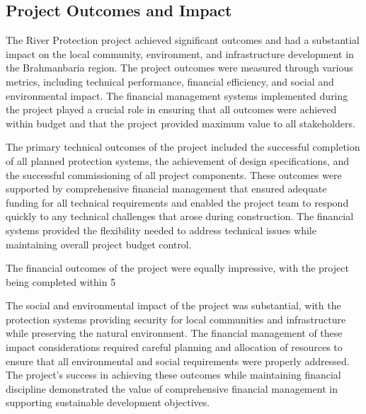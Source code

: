 \subsection{Project Outcomes and Impact}
The River Protection project achieved significant outcomes and had a substantial impact on the local community, environment, and infrastructure development in the Brahmanbaria region. The project outcomes were measured through various metrics, including technical performance, financial efficiency, and social and environmental impact. The financial management systems implemented during the project played a crucial role in ensuring that all outcomes were achieved within budget and that the project provided maximum value to all stakeholders.

The primary technical outcomes of the project included the successful completion of all planned protection systems, the achievement of design specifications, and the successful commissioning of all project components. These outcomes were supported by comprehensive financial management that ensured adequate funding for all technical requirements and enabled the project team to respond quickly to any technical challenges that arose during construction. The financial systems provided the flexibility needed to address technical issues while maintaining overall project budget control.

The financial outcomes of the project were equally impressive, with the project being completed within 5%

The social and environmental impact of the project was substantial, with the protection systems providing security for local communities and infrastructure while preserving the natural environment. The financial management of these impact considerations required careful planning and allocation of resources to ensure that all environmental and social requirements were properly addressed. The project's success in achieving these outcomes while maintaining financial discipline demonstrated the value of comprehensive financial management in supporting sustainable development objectives.

